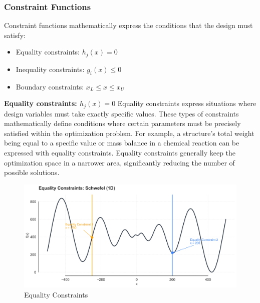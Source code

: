\subsubsection{Constraint Functions}
Constraint functions mathematically express the conditions that the design must satisfy:
\begin{itemize}
    \item Equality constraints: $h_j(x) = 0$
    \item Inequality constraints: $g_i(x) \leq 0$
    \item Boundary constraints: $x_L \leq x \leq x_U$ 
\end{itemize}

\textbf{Equality constraints: $h_j(x) = 0$}
Equality constraints express situations where design variables must take exactly specific values. These types of constraints mathematically define conditions where certain parameters must be precisely satisfied within the optimization problem. For example, a structure's total weight being equal to a specific value or mass balance in a chemical reaction can be expressed with equality constraints. Equality constraints generally keep the optimization space in a narrower area, significantly reducing the number of possible solutions.

\begin{figure}[H]
    \centering
    \includegraphics[width=1\textwidth]{weeks_new/imgs/equality_constraints.png}
    \caption{Equality Constraints}
    \label{fig:}
\end{figure}

